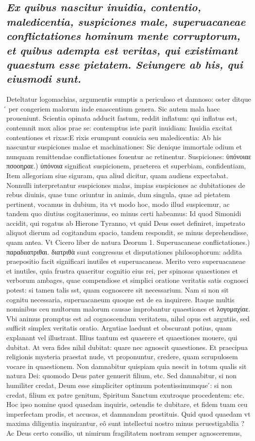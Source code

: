 \documentclass{article}
\begin{document}
\begin{pages}
\subsection*{\textit{Ex quibus nascitur inuidia, contentio, maledicentia, suspiciones male, superuacaneae conflictationes hominum mente corruptorum, et quibus adempta est veritas, qui existimant quaestum esse pietatem. Seiungere ab his, qui eiusmodi sunt. }}\pstart Deteltatur logomachias, argumentis sumptis a periculoso et damnoso: oster ditque ́ per congeriem malorum inde enascentium genera. Sic autem mala haec proueniunt. Scientia opinata adducit fastum, reddit inflatum: qui inflatus est, contemnit mox alios prae se: contemptus iste parit inuidiam: Inuidia excitat contentiones et rixas:E rixis erumpunt conuicia seu maledicentia: Ab his nascuntur suspiciones malae et machinationes: Sic denique immortale odium et nunquam remittendae conflictationes fouentur ac retinentur.  \pend\pstart Suspiciones: ὑπόνοιαε πσοοηραε.) ύπόνοια significat suspicionem, praeterea et superbiam, confidentiam, Item allegoriam siue siguram, qua aliud dicitur, quam audiens expectabat. Nonnulli interpretantur suspiciones malas, impias suspiciones ac dubitationes de rebus diuinis, quae tunc oriuntur in animis, dum singula, quae ad pietatem pertinent, vocamus in dubium, ita vt modo hoc, modo illud suspicemur, ac tandem quo diutius cogitauerimus, eo minus certi habeamus: Id quod Simonidi accidit, qui rogatus ab Hierone Tyranno, vt quid Deus esset definiret, impetrato aliquot dierum ad cogitandum spacio, tandem respondit, se minus deprehendisse, quam antea. Vt Cicero liber de natura Deorum 1.  \pend\pstart Superuacaneae conflictationes.) παραδιιατριθαι. διατριθὰ sunt congressus et disputationes philosophorum: addita praepositio facit significari inutiles et superuacaneas. Merito vero superuacaneae et inutiles, quia frustra quaeritur cognitio eius rei, per spinosas quaestiones et verborum ambages, quae compendiose et simplici oratione veritatis satis cognosci potest: si tamen talis sst, quam cognoscere sit necessarium. Nam si non sit cognitu necessaria, superuacaneum quoque est de ea inquirere. Itaque multis nominibus ceu multorum malorum causae improbantur quaestiones et λογομαχίαε. Vbi animus promptus est ad cognoscendum veritatem, nihsl opus est argutiis, sed sufficit simplex veritatis oratio. Argutiae laedunt et obscurant potius, quam explanant vel illustrant. Illius tantum est quaerere et quaestiones mouere, qui dubitat. At vera fides nihil dubitat: quare nec agnoscit quaestiones. Et praecipua religionis mysteria praestat nude, vt proponuntur, credere, quam scrupulosem vocare in quaestionem. Non damnabitur quispiam quia nescit in totum qualis sit natura Dei: quomodo Deus pater genuerit filium, etc. Sed damnabitur, si non humiliter credat, Deum esse simpliciter optimum potentissimumque ́: si non credat, filium ex patre genitum, Spiritum Sanctum exutroque procedentem: etc. Hoc ipso nomine quod quaedam inquiris, ostendis te dubitare, et fidem tuam ceu imperfectam prodis, et accusas, et damnandam prostituis. Quid quod quaedam vt maxima diligentia inquirantur, eô sunt intellectui nostro minus peruestigabilia ? Ac Deus certo consilio, ut nimirum fragilitatem nostram semper agnosceremus, 
\end{pages}
\end{document}
